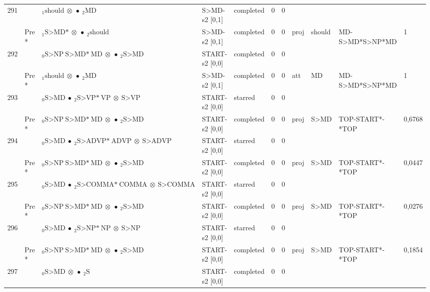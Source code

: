 \documentclass[10pt]{article}
\begin{document}
\begin{longtable}[htbp]{lllllllllll}
291 & & $ {}_1 \textrm{should} \  \otimes \  \bullet \ {}_{2} \textrm{MD} $ & S>MD-s2 [0,1] & completed & 0 & 0 & & & & \\ 
 & Pre *& $ {}_1 \textrm{S>MD*} \  \otimes \  \bullet \ {}_{2} \textrm{should} $ & S>MD-s2 [0,1] & completed & 0 & 0 & proj & should & MD-S>MD*S>NP*MD & 1 \\ 
292 & & $ {}_0 \textrm{S>NP} \ \textrm{S>MD*} \ \textrm{MD} \  \otimes \  \bullet \ {}_{2} \textrm{S>MD} $ & START-s2 [0,0] & completed & 0 & 0 & & & & \\ 
 & Pre *& $ {}_1 \textrm{should} \  \otimes \  \bullet \ {}_{2} \textrm{MD} $ & S>MD-s2 [0,1] & completed & 0 & 0 & att & MD & MD-S>MD*S>NP*MD & 1 \\ 
293 & & $ {}_0 \textrm{S>MD} \  \bullet \ {}_{2} \textrm{S>VP*} \ \textrm{VP} \  \otimes \ \textrm{S>VP} $ & START-s2 [0,0] & starred & 0 & 0 & & & & \\ 
 & Pre *& $ {}_0 \textrm{S>NP} \ \textrm{S>MD*} \ \textrm{MD} \  \otimes \  \bullet \ {}_{2} \textrm{S>MD} $ & START-s2 [0,0] & completed & 0 & 0 & proj & S>MD & TOP-START*-*TOP & 0,6768 \\ 
294 & & $ {}_0 \textrm{S>MD} \  \bullet \ {}_{2} \textrm{S>ADVP*} \ \textrm{ADVP} \  \otimes \ \textrm{S>ADVP} $ & START-s2 [0,0] & starred & 0 & 0 & & & & \\ 
 & Pre *& $ {}_0 \textrm{S>NP} \ \textrm{S>MD*} \ \textrm{MD} \  \otimes \  \bullet \ {}_{2} \textrm{S>MD} $ & START-s2 [0,0] & completed & 0 & 0 & proj & S>MD & TOP-START*-*TOP & 0,0447 \\ 
295 & & $ {}_0 \textrm{S>MD} \  \bullet \ {}_{2} \textrm{S>COMMA*} \ \textrm{COMMA} \  \otimes \ \textrm{S>COMMA} $ & START-s2 [0,0] & starred & 0 & 0 & & & & \\ 
 & Pre *& $ {}_0 \textrm{S>NP} \ \textrm{S>MD*} \ \textrm{MD} \  \otimes \  \bullet \ {}_{2} \textrm{S>MD} $ & START-s2 [0,0] & completed & 0 & 0 & proj & S>MD & TOP-START*-*TOP & 0,0276 \\ 
296 & & $ {}_0 \textrm{S>MD} \  \bullet \ {}_{2} \textrm{S>NP*} \ \textrm{NP} \  \otimes \ \textrm{S>NP} $ & START-s2 [0,0] & starred & 0 & 0 & & & & \\ 
 & Pre *& $ {}_0 \textrm{S>NP} \ \textrm{S>MD*} \ \textrm{MD} \  \otimes \  \bullet \ {}_{2} \textrm{S>MD} $ & START-s2 [0,0] & completed & 0 & 0 & proj & S>MD & TOP-START*-*TOP & 0,1854 \\ 
297 & & $ {}_0 \textrm{S>MD} \  \otimes \  \bullet \ {}_{2} \textrm{S} $ & START-s2 [0,0] & completed & 0 & 0 & & & & \\ 

\end{longtable}
\end{document}
